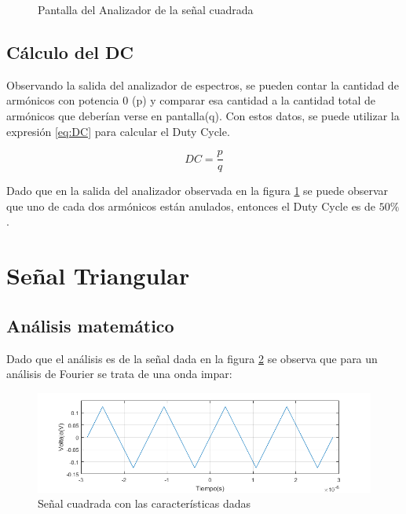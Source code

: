     \begin{figure}[ht]
        \begin{center}
            \caption{Pantalla del Analizador de la señal cuadrada}
            \label{fig:ansr,sqr}
        \end{center}
    \end{figure}

    \subsection{Cálculo del DC}
    Observando la salida del analizador de espectros, se pueden contar la cantidad 
    de armónicos con potencia 0 (p) y comparar esa cantidad a la cantidad total de
    armónicos que deberían verse en pantalla(q). Con estos datos, se puede utilizar
    la expresión \ref{eq:DC} para calcular el Duty Cycle.

    \begin{equation}
        DC = \frac{p}{q}
        \label{eq:DC}
    \end{equation}

    Dado que en la salida del analizador observada en la figura \ref{fig:ansr,sqr}
    se puede observar que uno de cada dos armónicos están anulados, entonces el
    Duty Cycle es de $50 \%$.

\section{Señal Triangular}
    \subsection{Análisis matemático}

    Dado que el análisis es de la señal dada en la figura \ref{fig:2,2,1}
    se observa que para un análisis de Fourier se trata de una onda
    impar:

    \begin{figure}[ht]
        \begin{center}
            \includegraphics[width=\linewidth]{contenido/img/sig_tri.png}
            \caption{Señal cuadrada con las características dadas}
            \label{fig:2,2,1}
        \end{center}
    \end{figure}

